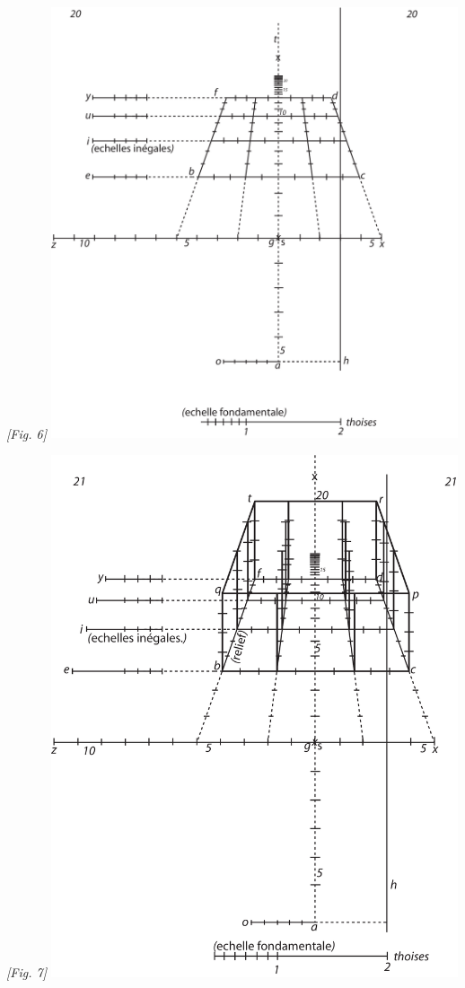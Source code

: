 \begin{center}
\\\rule[-4mm]{0mm}{10mm}\textit{[Fig. 6]}
\protect\clearpage
\includegraphics[width=0.9\textwidth]{images/T20-Desargues}
\\\rule[-4mm]{0mm}{10mm}\textit{[Fig. 7]}
\protect\clearpage
\includegraphics[width=0.9\textwidth]{images/T21-Desargues}

\end{center}
